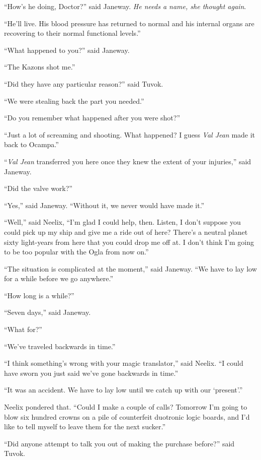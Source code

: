 \documentclass[twoside,letterpaper,12pt]{memoir}
\begin{document}
``How's he doing, Doctor?'' said Janeway. \textit{He needs a name, she thought again}. 

``He'll live. His blood pressure has returned to normal and his internal organs are recovering to their normal functional levels.'' 

``What happened to you?'' said Janeway. 

``The Kazons shot me.'' 

``Did they have any particular reason?'' said Tuvok. 

``We were stealing back the part you needed.'' 

``Do you remember what happened after you were shot?'' 

``Just a lot of screaming and shooting. What happened? I guess \textit{Val Jean} made it back to Ocampa.'' 

``\textit{Val Jean} transferred you here once they knew the extent of your injuries,'' said Janeway. 

``Did the valve work?'' 

``Yes,'' said Janeway. ``Without it, we never would have made it.'' 

``Well,'' said Neelix, ``I'm glad I could help, then. Listen, I don't suppose you could pick up my ship and give me a ride out of here? There's a neutral planet sixty light-years from here that you could drop me off at. I don't think I'm going to be too popular with the Ogla from now on.'' 

``The situation is complicated at the moment,'' said Janeway. ``We have to lay low for a while before we go anywhere.'' 

``How long is a while?'' 

``Seven days,'' said Janeway. 

``What for?'' 

``We've traveled backwards in time.'' 

``I think something's wrong with your magic translator,'' said Neelix. ``I could have sworn you just said we've gone backwards in time.'' 

``It was an accident. We have to lay low until we catch up with our `present'.'' 

Neelix pondered that. ``Could I make a couple of calls? Tomorrow I'm going to blow six hundred crowns on a pile of counterfeit duotronic logic boards, and I'd like to tell myself to leave them for the next sucker.'' 

``Did anyone attempt to talk you out of making the purchase before?'' said Tuvok. 
\end{document}
